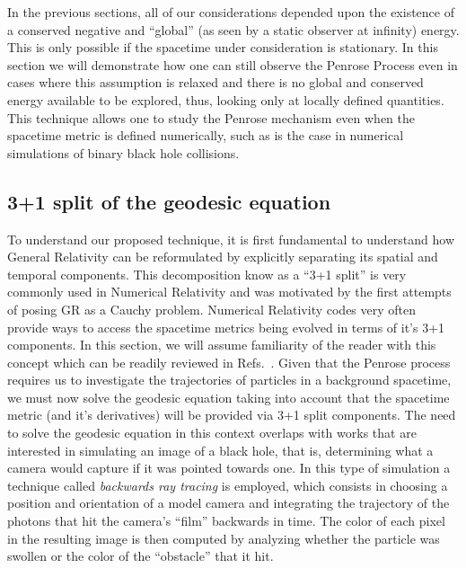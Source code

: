 In the previous sections, all of our considerations depended upon the existence of a conserved negative and ``global'' (as seen by a static observer at infinity) energy. This is only possible if the spacetime under consideration is stationary. In this section we will demonstrate how one can still observe the Penrose Process even in cases where this assumption is relaxed and there is no global and conserved energy available to be explored, thus, looking only at locally defined quantities. This technique allows one to study the Penrose mechanism even when the spacetime metric is defined numerically, such as is the case in numerical simulations of binary black hole collisions.

\subsection{3+1 split of the geodesic equation}

To understand our proposed technique, it is first fundamental to understand how General Relativity can be reformulated by explicitly separating its spatial and temporal components. This decomposition know as a ``3+1 split'' is very commonly used in Numerical Relativity and was motivated by the first attempts of posing GR as a Cauchy problem. Numerical Relativity codes very often provide ways to access the spacetime metrics being evolved in terms of it's 3+1 components. In this section, we will assume familiarity of the reader with this concept which can be readily reviewed in Refs.~\cite{Alcubierre2012-xp, 9780521514071, 9781108928250}. Given that the Penrose process requires us to investigate the trajectories of particles in a background spacetime, we must now solve the geodesic equation taking into account that the spacetime metric (and it's derivatives) will be provided via 3+1 split components. The need to solve the geodesic equation in this context overlaps with works that are interested in simulating an image of a black hole, that is, determining what a camera would capture if it was pointed towards one. In this type of simulation a technique called \emph{backwards ray tracing} is employed, which consists in choosing a position and orientation of a model camera and integrating the trajectory of the photons that hit the camera's ``film'' backwards in time. The color of each pixel in the resulting image is then computed by analyzing whether the particle was swollen or the color of the ``obstacle'' that it hit.

